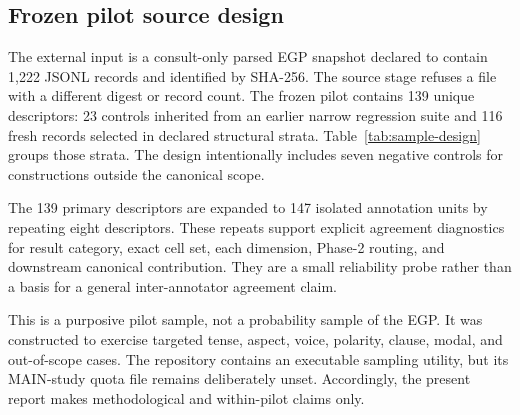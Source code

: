 \subsection{Frozen pilot source design}

The external input is a consult-only parsed EGP snapshot declared to contain
1,222 JSONL records and identified by SHA-256.  The source stage refuses a file
with a different digest or record count.  The frozen pilot contains 139 unique
descriptors: 23 controls inherited from an earlier narrow regression suite and
116 fresh records selected in declared structural strata.  Table~\ref{tab:sample-design}
groups those strata.  The design intentionally includes seven negative controls
for constructions outside the canonical scope.



The 139 primary descriptors are expanded to 147 isolated annotation units by
repeating eight descriptors.  These repeats support explicit agreement
diagnostics for result category, exact cell set, each dimension, Phase-2
routing, and downstream canonical contribution.  They are a small reliability
probe rather than a basis for a general inter-annotator agreement claim.

This is a purposive pilot sample, not a probability sample of the EGP.  It was
constructed to exercise targeted tense, aspect, voice, polarity, clause, modal,
and out-of-scope cases.  The repository contains an executable sampling
utility, but its MAIN-study quota file remains deliberately unset.  Accordingly,
the present report makes methodological and within-pilot claims only.

